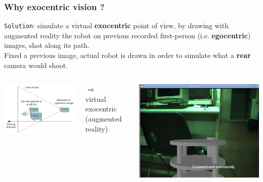 \frame
{
  \frametitle{Why exocentric vision ?}

  \alert{\texttt{Solution}}: simulate a virtual \textbf{exocentric} point of view, by drawing with augmented reality
  the robot on previous recorded first-person (i.e. \textbf{egocentric}) images, shot along its path. \\
  
  \vskip8pt
  \pause
  Fixed a previous image, actual robot is drawn in order to
  simulate what a \textbf{rear} camera would shoot.
  
  \vskip8pt
  \pause
  
  \begin{columns}
    
     {
      \includegraphics[width=\textwidth]{img/exocentric_vision.jpg}
    }

    \pause
    
     {
      \begin{center}
        $\Longrightarrow$ \\
        \alert{virtual exocentric} (augmented reality)
      \end{center}
    }

    \pause

     {
      \includegraphics[width=\textwidth]{img/virtual_exocentric.jpg}
    }
    
  \end{columns}



}
